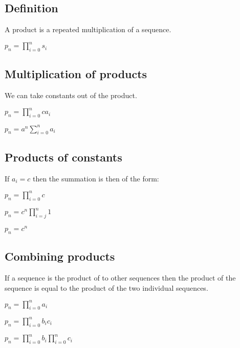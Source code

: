 
\subsection{Definition}


A product is a repeated multiplication of a sequence.

\(p_n=\prod_{i=0}^ns_i\)

\subsection{Multiplication of products}

We can take constants out of the product.

\(p_n=\prod_{i=0}^nca_i\)

\(p_n=a^{n}\sum_{i=0}^na_i\)

\subsection{Products of constants}

If \(a_i=c\) then the summation is then of the form:

\(p_n=\prod_{i=0}^nc\)

\(p_n=c^{n}\prod_{i=j}^n1\)

\(p_n=c^{n}\)

\subsection{Combining products}

If a sequence is the product of to other sequences then the product of the sequence is equal to the product of the two individual sequences.

\(p_n=\prod_{i=0}^na_i\)

\(p_n=\prod_{i=0}^nb_ic_i\)

\(p_n=\prod_{i=0}^nb_i\prod_{i=0}^nc_i\)

